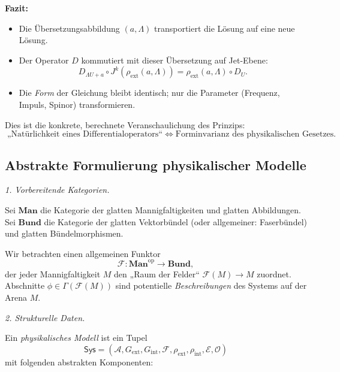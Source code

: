 \documentclass[10pt, letterpaper]{article}
\begin{document}
\bigskip
\textbf{Fazit:}
\begin{itemize}
\item Die Übersetzungsabbildung $(a,\Lambda)$ transportiert die Lösung auf eine neue Lösung.
\item Der Operator $D$ kommutiert mit dieser Übersetzung auf Jet-Ebene:
\[
D_{\Lambda U + a}\circ J^k(\rho_{\mathrm{ext}}(a,\Lambda))
= \rho_{\mathrm{ext}}(a,\Lambda)\circ D_U.
\]
\item Die \emph{Form} der Gleichung bleibt identisch; nur die Parameter 
(Frequenz, Impuls, Spinor) transformieren.
\end{itemize}
Dies ist die konkrete, berechnete Veranschaulichung des Prinzips:
\[
\boxed{
\text{„Natürlichkeit eines Differentialoperators“}
\;\Longleftrightarrow\;
\text{Forminvarianz des physikalischen Gesetzes.}
}
\]

\pagebreak

\subsection{Abstrakte Formulierung physikalischer Modelle}

\emph{1. Vorbereitende Kategorien.}

Sei $\mathbf{Man}$ die Kategorie der glatten Mannigfaltigkeiten und glatten Abbildungen.  
Sei $\mathbf{Bund}$ die Kategorie der glatten Vektorbündel (oder allgemeiner: Faserbündel) und glatten Bündelmorphismen.  

Wir betrachten einen allgemeinen Funktor
\[
\mathcal{F}: \mathbf{Man}^{\mathrm{op}} \longrightarrow \mathbf{Bund},
\]
der jeder Mannigfaltigkeit $M$ den „Raum der Felder“ $\mathcal{F}(M)\to M$ zuordnet.  
Abschnitte $\phi\in \Gamma(\mathcal{F}(M))$ sind potentielle \emph{Beschreibungen} des Systems auf der Arena $M$.

\bigskip
\emph{2. Strukturelle Daten.}

Ein \emph{physikalisches Modell} ist ein Tupel
\[
\mathsf{Sys}
= (\mathcal{A}, G_{\mathrm{ext}}, G_{\mathrm{int}},
  \mathcal{F}, \rho_{\mathrm{ext}}, \rho_{\mathrm{int}},
  \mathcal{E}, \mathcal{O})
\]
mit folgenden abstrakten Komponenten:
\end{document}
